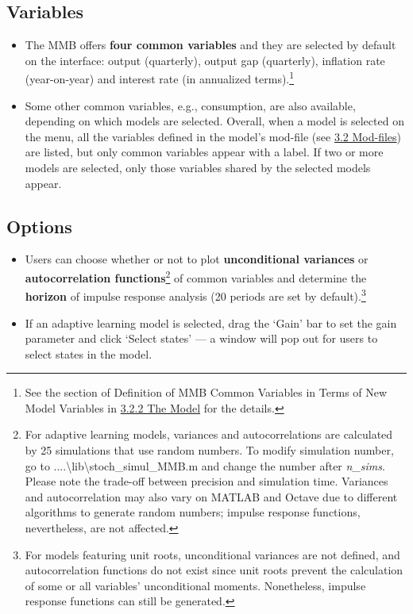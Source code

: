 \documentclass[10pt,a4paper]{article}
\begin{document}
\subsection{Variables}
\label{sec:Var}
\medskip

\begin{itemize}
\item The MMB offers \textbf{four common variables} and they are selected by default on the interface: output (quarterly), output gap (quarterly), inflation rate (year-on-year) and interest rate (in annualized terms).\footnote{See the section of Definition of MMB Common Variables in Terms of New Model Variables in \hyperref[sec:Model]{3.2.2 The Model} for the details.}

\item Some other common variables, e.g., consumption, are also available, depending on which models are selected. Overall, when a model is selected on the menu, all the variables defined in the model’s mod-file (see \hyperref[sec:Mod]{3.2 Mod-files}) are listed, but only common variables appear with a label. If two or more models are selected, only those variables shared by the selected models appear.
\end{itemize}

\subsection{Options}
\medskip

\begin{itemize}
\item Users can choose whether or not to plot \textbf{unconditional variances} or \textbf{autocorrelation functions}\footnote{For adaptive learning models, variances and autocorrelations are calculated by 25 simulations that use random numbers. To modify simulation number, go to ....\textbackslash lib\textbackslash stoch\_simul\_MMB.m and change the number after \textit{n\_sims}. Please note the trade-off between precision and simulation time. Variances and autocorrelation may also vary on MATLAB and Octave due to different algorithms to generate random numbers; impulse response functions, nevertheless, are not affected.} of common variables and determine the \textbf{horizon} of impulse response analysis (20 periods are set by default).\footnote{For models featuring unit roots, unconditional variances are not defined, and autocorrelation functions do not exist since unit roots prevent the calculation of some or all variables’ unconditional moments. Nonetheless, impulse response functions can still be generated.} 

\item If an adaptive learning model is selected, drag the ‘Gain’ bar to set the gain parameter and click ‘Select states’ — a window will pop out for users to select states in the model.
\end{itemize}
\end{document}
